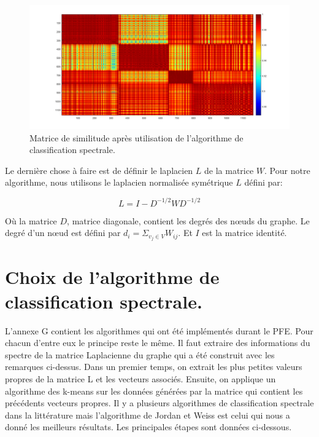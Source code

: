 \begin{figure}[H]
\centering
    \includegraphics[scale=0.45,angle=0]{Images/MatrixAffinity.png}
    \caption{Matrice de similitude après utilisation de l'algorithme de classification spectrale.}
    \label{fig:MatrixAffinity}
\end{figure}

Le dernière chose à faire est de définir le laplacien $L$ de la matrice $W$. Pour notre algorithme, nous utilisons le laplacien normalisée symétrique  $L $ défini par:

\begin{equation}
L = I-D^{-1/2}WD^{-1/2}
\end{equation}

Où la matrice $D$, matrice diagonale, contient les degrés des nœuds du graphe. Le degré d'un nœud est défini par $d_i = \Sigma_{v_j \in V} W_{ij}$. Et $I$ est la matrice identité.



\section{Choix de l'algorithme de classification spectrale.}

L'annexe G contient les algorithmes qui ont été implémentés durant le PFE. Pour chacun d'entre eux le principe reste le même. Il faut extraire des informations du spectre de la matrice Laplacienne du graphe qui a été construit avec les remarques ci-dessus. Dans un premier temps, on extrait les plus petites valeurs propres de la matrice L et les vecteurs associés. Ensuite, on applique un algorithme des k-means sur les données générées par la matrice qui contient les précédents vecteurs propres. Il y a plusieurs algorithmes de classification spectrale dans la littérature \cite{mouysset2010contributions} mais l'algorithme de Jordan et Weiss est celui qui nous a donné les meilleurs résultats. Les principales étapes sont données ci-dessous.

